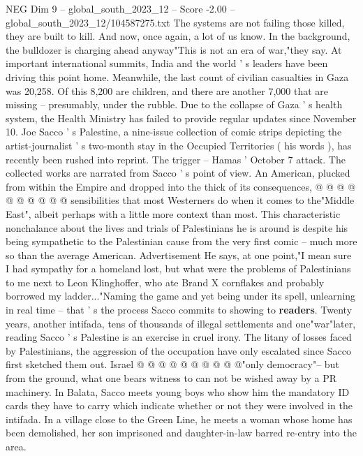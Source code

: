 \begin{textsample}{NEG Dim 9 – global\_south\_2023\_12 – Score -2.00 – global\_south\_2023\_12/104587275.txt}  \label{ex:f9_neg_437}
The systems are not failing those killed, they are built to kill.
And now, once again, a lot of us know.
In the background, the bulldozer is charging ahead anyway"This is not an era of war,"they say.
At important international summits, India and the world ' s leaders have been driving this point home.
Meanwhile, the last count of civilian casualties in Gaza was 20,258.
Of this 8,200 are children, and there are another 7,000 that are missing -- presumably, under the rubble.
Due to the collapse of Gaza ' s health system, the Health Ministry has failed to provide regular updates since November 10.
Joe Sacco ' s Palestine, a nine-issue collection of comic strips depicting the artist-journalist ' s two-month stay in the Occupied Territories ( his words ), has recently been rushed into reprint.
The trigger -- Hamas ' October 7 attack.
The collected works are narrated from Sacco ' s point of view.
An American, plucked from within the Empire and dropped into the thick of its consequences, @ @ @ @ @ @ @ @ @ @ sensibilities that most Westerners do when it comes to the"Middle East", albeit perhaps with a little more context than most.
This characteristic nonchalance about the lives and trials of Palestinians he is around is despite his being sympathetic to the Palestinian cause from the very first comic -- much more so than the average American.
Advertisement He says, at one point,"I mean sure I had sympathy for a homeland lost, but what were the problems of Palestinians to me next to Leon Klinghoffer, who ate Brand X cornflakes and probably borrowed my ladder..."Naming the game and yet being under its spell, unlearning in real time -- that ' s the process Sacco commits to showing to \textbf{readers}.
Twenty years, another intifada, tens of thousands of illegal settlements and one"war"later, reading Sacco ' s Palestine is an exercise in cruel irony.
The litany of losses faced by Palestinians, the aggression of the occupation have only escalated since Sacco first sketched them out.
Israel @ @ @ @ @ @ @ @ @ @"only democracy"-- but from the ground, what one bears witness to can not be wished away by a PR machinery.
In Balata, Sacco meets young boys who show him the mandatory ID cards they have to carry which indicate whether or not they were involved in the intifada.
In a village close to the Green Line, he meets a woman whose home has been demolished, her son imprisoned and daughter-in-law barred re-entry into the area.

\end{textsample}
